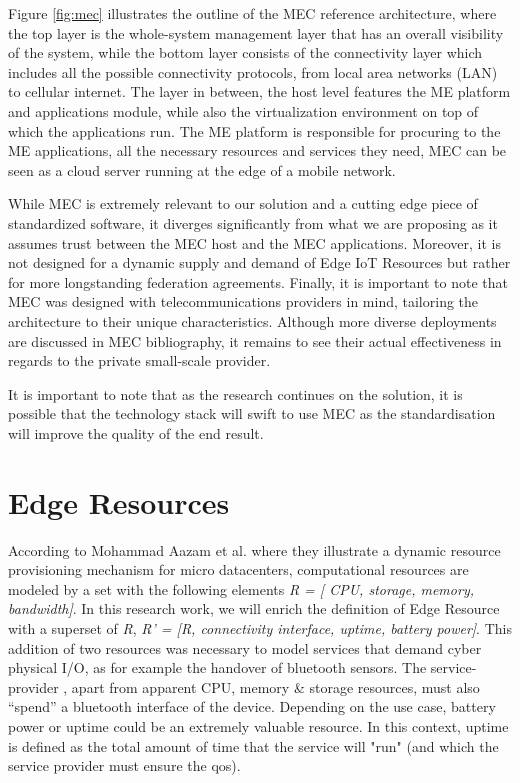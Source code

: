 Figure \ref{fig:mec} illustrates the outline of the MEC reference architecture, where the top layer is the whole-system management layer that has an overall visibility of the system, while the bottom layer consists of the connectivity layer which includes all the possible connectivity protocols, from local area networks (LAN) to cellular internet. The layer in between, the host level features the ME platform and applications module, while also the virtualization environment on top of which the applications run. The ME platform is responsible for procuring to the ME applications, all the necessary resources and services they need, MEC can be seen as a cloud server running at the edge of a mobile network.

While MEC is extremely relevant to our solution and a cutting edge piece of standardized software, it diverges significantly from what we are proposing as it assumes trust between the MEC host and the MEC applications. Moreover, it is not designed for a dynamic supply and demand of Edge IoT Resources but rather for more longstanding federation agreements.  Finally, it is important to note that MEC was designed with telecommunications providers in mind, tailoring the architecture to their unique characteristics. Although more diverse deployments are discussed in MEC bibliography, it remains to see their actual effectiveness in regards to the private small-scale provider.

It is important to note that as the research continues on the solution, it is possible that the technology stack will swift to use MEC as the standardisation will improve the quality of the end result.


\section{Edge Resources} \label{st:edge-resources}

According to Mohammad Aazam et al.\cite{aazam2015dynamic} where they illustrate a dynamic resource provisioning mechanism for micro datacenters, computational resources are modeled by a set with the following elements \textit{R = [ CPU, storage, memory, bandwidth]}. In this research work, we will enrich the definition of Edge Resource with a superset of \textit{R}, \textit{R’ = [R, connectivity interface, uptime, battery power]}. This addition of two resources was necessary to model services that demand cyber physical I/O, as for example the handover of bluetooth sensors. The service-provider , apart from apparent CPU, memory \& storage resources, must also “spend” a bluetooth interface of the device. Depending on the use case, battery power or uptime could be an extremely valuable resource. In this context, uptime is defined as the total amount of time that the service will "run" (and which the service provider must ensure the \acrshort{qos}).

